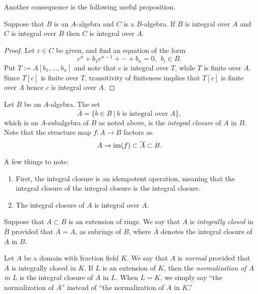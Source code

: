 Another consequence is the following useful proposition.
\begin{proposition}
  Suppose that $B$ is an $A$-algebra and $C$ is a $B$-algebra.
  If $B$ is integral over $A$ and $C$ is integral over $B$ then $C$ is integral over $A$.
\end{proposition}
\begin{proof}
  Let $c \in C$ be given, and find an equation of the form
  \[ c^{n} + b_{1} c^{n-1} + \cdots + b_{n} = 0, \ \ b_{i} \in B. \]
  Put $T := A[b_{1},\ldots,b_{n}]$ and note that $c$ is integral over $T$, while $T$ is finite over $A$.
  Since $T[c]$ is finite over $T$, transitivity of finiteness implies that $T[c]$ is finite over $A$ hence $c$ is integral over $A$.
\end{proof}

\begin{definition}
  Let $B$ be an $A$-algebra.
  The set
  \[ \bar A = \{b \in B \ | \ \text{$b$ is integral over $A$}\}, \]
  which is an $A$-subalgebra of $B$ as noted above, is the \emph{integral closure} of $A$ in $B$.
  Note that the structure map $f : A \to B$ factors as
  \[ A \to \operatorname{im}(f) \subset \overline A \subset B. \]
\end{definition}

A few things to note:
\begin{enumerate}
  \item First, the integral closure is an idempotent operation, meaning that the integral closure of the integral closure is the integral closure.
  \item The integral closure of $A$ is integral over $A$.
\end{enumerate}

\begin{definition}
  Suppose that $A \subset B$ is an extension of rings.
  We say that $A$ is \emph{integrally closed} in $B$ provided that $\bar A = A$, as subrings of $B$, where $\bar A$ denotes the integral closure of $A$ in $B$.
\end{definition}

\begin{definition}
  Let $A$ be a domain with fraction field $K$.
  We say that $A$ is \emph{normal} provided that $A$ is integrally closed in $K$.
  If $L$ is an extension of $K$, then the \emph{normalization of $A$ in $L$} is the integral closure of $A$ in $L$.
  When $L = K$, we simply say ``the normalization of $A$'' instead of ``the normalization of $A$ in $K$.''
\end{definition}

